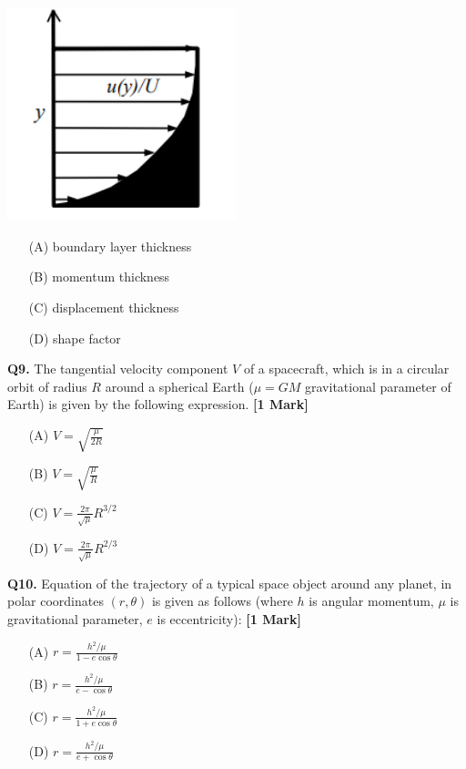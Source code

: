 \documentclass[11pt]{article}
\newcommand{\questiona}[2]{
    \noindent\textbf{Q#2.} #1 \hfill \textbf{[1 Mark]}
}
\begin{document}
\begin{center}
\includegraphics[width=0.5\textwidth]{figures/8.png}
\end{center}

\begin{enumerate}
    \item[(A)] boundary layer thickness  
    \item[(B)] momentum thickness  
    \item[(C)] displacement thickness  
    \item[(D)] shape factor  
\end{enumerate}

\vspace{0.5cm}

\questiona{The tangential velocity component $V$ of a spacecraft, which is in a circular orbit of radius $R$ around a spherical Earth ($\mu = GM$ gravitational parameter of Earth) is given by the following expression.}{9}
\begin{enumerate}
    \item[(A)] $V = \sqrt{\frac{\mu}{2R}}$  
    \item[(B)] $V = \sqrt{\frac{\mu}{R}}$  
    \item[(C)] $V = \frac{2\pi}{\sqrt{\mu}} R^{3/2}$  
    \item[(D)] $V = \frac{2\pi}{\sqrt{\mu}} R^{2/3}$  
\end{enumerate}

\vspace{0.5cm}

\questiona{Equation of the trajectory of a typical space object around any planet, in polar coordinates $(r, \theta)$ is given as follows (where $h$ is angular momentum, $\mu$ is gravitational parameter, $e$ is eccentricity):}{10}
\begin{enumerate}
    \item[(A)] $r = \frac{h^2/\mu}{1 - e\cos\theta}$  
    \item[(B)] $r = \frac{h^2/\mu}{e - \cos\theta}$  
    \item[(C)] $r = \frac{h^2/\mu}{1 + e\cos\theta}$  
    \item[(D)] $r = \frac{h^2/\mu}{e + \cos\theta}$  
\end{enumerate}
\end{document}

